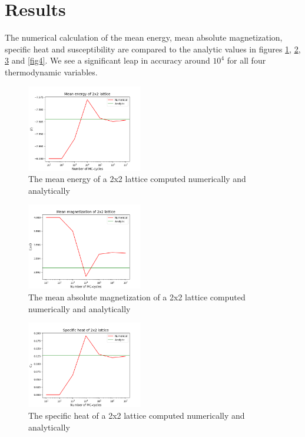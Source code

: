 \documentclass[notitlepage, reprint, nofootinbib]{revtex4-1}
\begin{document}
\section{Results}
The numerical calculation of the mean energy, mean absolute magnetization, specific heat and susceptibility are compared to the analytic values in figures \ref{fig1}, \ref{fig2}, \ref{fig3} and \ref{fig4}. We see a significant leap in accuracy around $10^4$ for all four thermodynamic variables. 
\begin{figure}
	\centering
	\includegraphics[width=0.45\textwidth]{../Figures/E_mean_4b.png}
	\caption{The mean energy of a 2x2 lattice computed numerically and analytically}
	\label{fig1}
\end{figure}

\begin{figure}
	\centering
	\includegraphics[width=0.45\textwidth]{../Figures/M_mean_4b.png}
	\caption{The mean absolute magnetization of a 2x2 lattice computed numerically and analytically}
	\label{fig2}
\end{figure}

\begin{figure}
	\centering
	\includegraphics[width=0.45\textwidth]{../Figures/C_V_4b.png}
	\caption{The specific heat of a 2x2 lattice computed numerically and analytically}
	\label{fig3}
\end{figure}
\end{document}
